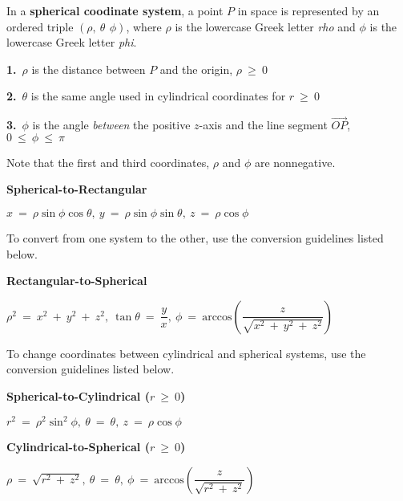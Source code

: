\documentclass{article}
\begin{document}
\begin{large}
\hspace{0.1in} In a \textbf{spherical coodinate system}, a point $P$ in space is represented by an ordered triple $(\rho,\ \theta\,\ \phi)$, where $\rho$ is the lowercase Greek letter \textit{rho} and $\phi$ is the lowercase Greek letter \textit{phi}.

\hspace{0.2in} \textbf{1.}\ $\rho$ is the distance between $P$ and the origin, $\rho\ \geq\ 0$

\hspace{0.2in} \textbf{2.}\ $\theta$ is the same angle used in cylindrical coordinates for $r\ \geq\ 0$

\hspace{0.2in} \textbf{3.}\ $\phi$ is the angle \textit{between} the positive $z$-axis and the line segment $\overrightarrow{OP}$, $0\ \leq\ \phi\ \leq\ \pi$

\hspace{0.1in} Note that the first and third coordinates, $\rho$ and $\phi$ are nonnegative.

\textbf{Spherical-to-Rectangular}

\hspace{1.5in} $x\ =\ \rho\sin \phi\cos \theta,\ y\ =\ \rho\sin \phi\sin \theta,\ z\ =\ \rho\cos \phi$

\hspace{0.1in} To convert from one system to the other, use the conversion guidelines listed below.

\textbf{Rectangular-to-Spherical}

\hspace{1.0in} $\rho^{2}\ =\ x^{2}\ +\ y^{2}\ +\ z^{2},\ \tan \theta\ =\ \dfrac{y}{x},\ \phi\ =\ \text{arccos}\left(\dfrac{z}{\sqrt{x^{2}\ +\ y^{2}\ +\ z^{2}}}\right)$

\hspace{0.1in} To change coordinates between cylindrical and spherical systems, use the conversion guidelines listed below.

\textbf{Spherical-to-Cylindrical ($r\ \geq\ 0$)}

\hspace{1.0in} $r^{2}\ =\ \rho^{2}\sin ^{2}\phi,\ \theta\ =\ \theta,\ z\ =\ \rho\cos \phi$

\textbf{Cylindrical-to-Spherical ($r\ \geq\ 0$)}

\hspace{1.0in} $\rho\ =\ \sqrt{r^{2}\ +\ z^{2}},\ \theta\ =\ \theta,\ \phi\ =\ \text{arccos}\left(\dfrac{z}{\sqrt{r^{2}\ +\ z^{2}}}\right)$


\end{large}
\end{document}
